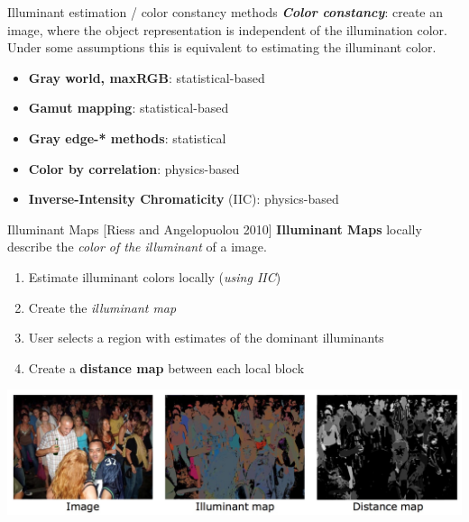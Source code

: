 \begin{tframe}{Illuminant estimation / color constancy methods}
\vspace{0.1cm}
\textbf{\emph{Color constancy}}: create an image, where the object representation is independent of the illumination color.
Under some assumptions this is equivalent to estimating the illuminant color.
\vspace{0.3cm}
\begin{small}
\begin{itemize}
\item \textbf{Gray world, maxRGB}: statistical-based
\vspace{0.1cm}
\item \textbf{Gamut mapping}: statistical-based
\vspace{0.1cm}
\item \textbf{Gray edge-* methods}: statistical
\vspace{0.1cm}
\item \textbf{Color by correlation}: physics-based
\vspace{0.1cm}
\item \textbf{Inverse-Intensity Chromaticity} (IIC): physics-based
\end{itemize}
\end{small}
\end{tframe}

\begin{tframe}{Illuminant Maps {\small [Riess and Angelopuolou 2010]}}
\vspace{0.1cm}
\textbf{Illuminant Maps} locally describe the \emph{color of the illuminant} of a image.
\vspace{0.1cm}
\begin{enumerate}
\item Estimate illuminant colors locally (\emph{using IIC})
\item Create the \emph{illuminant map} 
\item User selects a region with estimates of the dominant illuminants
\item Create a \textbf{distance map} between each local block
\end{enumerate}
\vspace{0.1cm}
\centering
\includegraphics[width=\textwidth]{images/riess.jpg}
\end{tframe}

